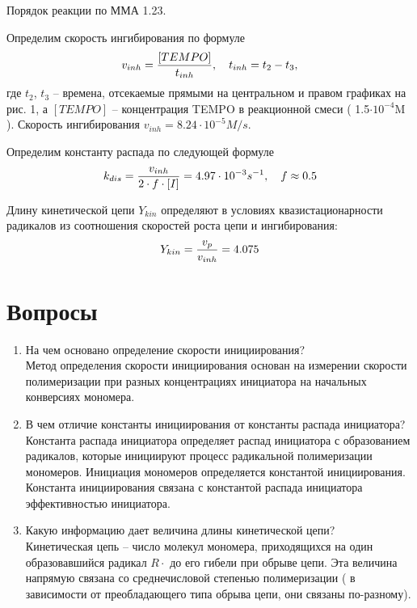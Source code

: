 \documentclass[12pt]{article}
\begin{document}
Порядок реакции по ММА 1.23.

Определим скорость ингибирования по формуле
\begin{gather}
		v_{inh} = \frac{[TEMPO]}{t_{inh}}, \quad t_{inh} = t_2 - t_3, \notag
\end{gather}
где $t_2$, $t_3$ -- времена, отсекаемые прямыми на центральном и правом графиках на рис. 1, а $[TEMPO]$ -- концентрация TEMPO в реакционной смеси ( 1.5$\cdot 10^{-4}$M ). Скорость ингибирования $v_{inh} = 8.24 \cdot 10^{-5} M/s$. \par
Определим константу распада по следующей формуле
\begin{gather}
	k_{dis} = \frac{v_{inh}}{2 \cdot f \cdot [I]} = 4.97 \cdot 10^{-3} s^{-1}, \quad f \approx 0.5 \notag
\end{gather}

Длину кинетической цепи $Y_{kin}$ определяют в условиях квазистационарности радикалов из соотношения скоростей роста цепи и ингибирования:
\begin{gather}
		Y_{kin} = \frac{v_p}{v_{inh}} = 4.075 \notag
\end{gather}

\section{Вопросы}
\begin{enumerate}
	\item На чем основано определение скорости инициирования? \\
	Метод определения скорости инициирования основан на измерении скорости полимеризации при разных концентрациях инициатора на начальных конверсиях мономера.
	\item В чем отличие константы инициирования от константы распада инициатора? \\
	Константа распада инициатора определяет распад инициатора с образованием радикалов, которые инициируют процесс радикальной полимеризации мономеров. Инициация мономеров определяется константой инициирования. Константа инициирования связана с константой распада инициатора эффективностью инициатора.
	\item Какую информацию дает величина длины кинетической цепи? \\
	Кинетическая цепь -- число молекул мономера, приходящихся на один образовавшийся радикал $R\cdot$  до его гибели при обрыве цепи. Эта величина напрямую связана со среднечисловой степенью полимеризации ( в зависимости от преобладающего типа обрыва цепи, они связаны по-разному). 
\end{enumerate}
\end{document}

